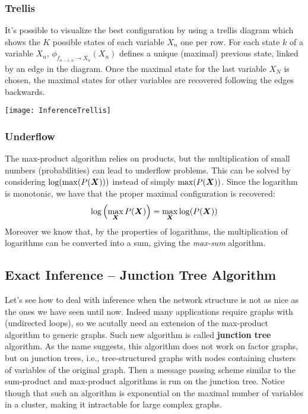 \subsubsection{Trellis}
It's possible to visualize the best configuration by using a trellis diagram which shows the $K$ possible states of each variable $X_n$ one per row. For each state $k$ of a variable $X_n$, $\phi_{f_{n-1, n}\rightarrow X_n}(X_n)$ defines a unique (maximal) previous state, linked by an edge in the diagram. \newline
Once the maximal state for the last variable $X_N$ is chosen, the maximal states for other variables are recovered following the edges backwards. 
\begin{center}
  \texttt{[image: InferenceTrellis]}
\end{center}
%
\subsubsection{Underflow}
The max-product algorithm relies on products, but the multiplication of small numbers (probabilities) can lead to underflow problems. This can be solved by considering $\log(\max(P(\bm{X})))$ instead of simply $\max(P(\bm{X}))$. \newline
Since the logarithm is monotonic, we have that the proper maximal configuration is recovered:
\[\log\left(\max\limits_{\bm{X}}P(\bm{X})\right)=\max\limits_{\bm{X}}\log(P(\bm{X}))\]
Moreover we know that, by the properties of logarithms, the multiplication of logarithms can be converted into a sum, giving the \textit{max-sum} algorithm. \newline
%
%
\subsection{Exact Inference -- Junction Tree Algorithm}
Let's see how to deal with inference when the network structure is not as nice as the ones we have seen until now. Indeed many applications require graphs with (undirected loops), so we acutally need an extension of the max-product algorithm to generic graphs. \newline
Such new algorithm is called \textbf{junction tree} algorithm. As the name suggests, this algorithm does not work on factor graphs, but on junction trees, i.e., tree-structured graphs with nodes containing clusters of variables of the original graph. Then a message passing scheme similar to the sum-product and max-product algorithms is run on the junction tree. \newline
Notice though that such an algorithm is exponential on the maximal number of variables in a cluster, making it intractable for large complex graphs. 
%
%
